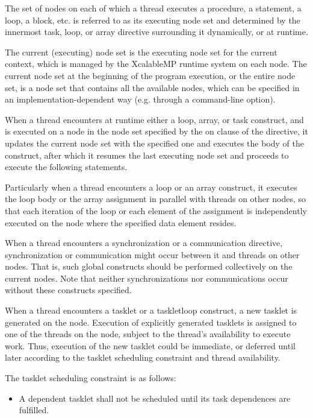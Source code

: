 The set of nodes on each of which a thread executes a procedure, a
statement, a loop, a block, etc. is referred to as its executing node
set and determined by the innermost task, loop, or array directive
surrounding it dynamically, or at runtime.

The current (executing) node set is the executing node set for the
current context, which is managed by the XcalableMP runtime system on
each node. The current node set at the beginning of the
program execution, or the entire node set, is a node set that contains
all the available nodes, which can be specified in an
implementation-dependent way (e.g. through a command-line option).

When a thread encounters at runtime either a loop, array, or task
construct, and is executed on a node in the node set specified by
the on clause of the directive, it updates the current node set with
the specified one and executes the body of the construct, after which
it resumes the last executing node set and proceeds to execute the
following statements.

Particularly when a thread encounters a loop or an array construct, it
executes the loop body or the array assignment in parallel with
threads on other nodes, so that each iteration of the loop or each
element of the assignment is independently executed on the node where
the specified data element resides.

When a thread encounters a synchronization or a communication
directive, synchronization or communication might occur between it and
threads on other nodes. That is, such global constructs should be
performed collectively on the current nodes. Note that neither
synchronizations nor communications occur without these constructs
specified.

When a thread encounters a tasklet or a taskletloop construct, a new
tasklet is generated on the node. Execution of explicitly generated
tasklets is assigned to one of the threads on the node, subject to the
thread’s availability to execute work. Thus, execution of the new
tasklet could be immediate, or deferred until later according to the
tasklet scheduling constraint and thread availability.

The tasklet scheduling constraint is as follows:

\begin{itemize}
  \item A dependent tasklet shall not be scheduled until its task
		dependences are fulfilled.
\end{itemize}

